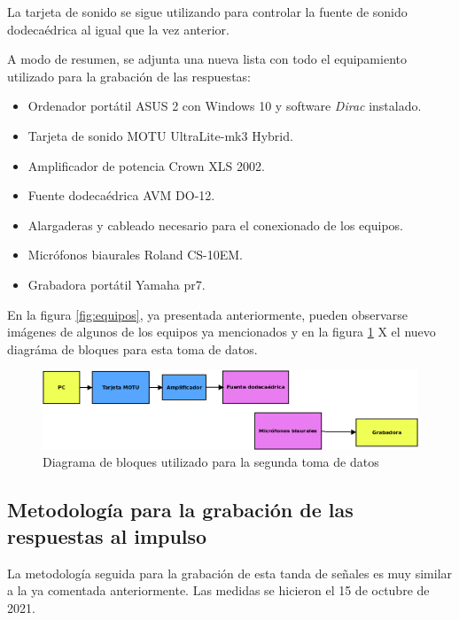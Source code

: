 \documentclass[11pt,a4paper,twoside]{book}
\begin{document}
            La tarjeta de sonido se sigue utilizando para controlar la fuente de sonido dodecaédrica al igual que la vez anterior.
                
            A modo de resumen, se adjunta una nueva lista con todo el equipamiento utilizado para la grabación de las respuestas:
                
            \begin{itemize}
                \item Ordenador portátil ASUS 2 con Windows 10 y software \textit{Dirac} instalado.
	            \item Tarjeta de sonido MOTU UltraLite-mk3 Hybrid.
	            \item Amplificador de potencia Crown XLS 2002.
	            \item Fuente dodecaédrica AVM DO-12.
	            \item Alargaderas y cableado necesario para el conexionado de los equipos.
	            \item Micrófonos biaurales Roland CS-10EM.
	            \item Grabadora portátil Yamaha pr7.
            \end{itemize}
                
            En la figura \ref{fig:equipos}, ya presentada anteriormente, pueden observarse imágenes de algunos de los equipos ya mencionados y en la figura \ref{fig:bloques2} X el nuevo diagráma de bloques para esta toma de datos.
            
            \begin{figure}
	            \includegraphics[scale=0.47]{../imagenes/diagrama_bloques2.png}
			    \centering
			    \caption{Diagrama de bloques utilizado para la segunda toma de datos}
			    \label{fig:bloques2}
	        \end{figure}
            
            
                
        \subsection{Metodología para la grabación de las respuestas al impulso}
            La metodología seguida para la grabación de esta tanda de señales es muy similar a la ya comentada anteriormente. Las medidas se hicieron el 15 de octubre de 2021.
                
\end{document}

